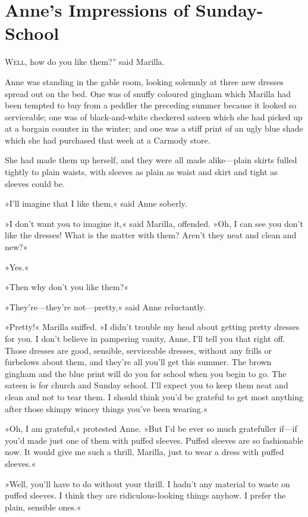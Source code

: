 \chapter{Anne’s Impressions of Sunday-School}

\lettrine[ante=“,lines=4]{W}{ell}, how do you like them?” said Marilla.

\zz
Anne was standing in the gable room, looking solemnly at three new dresses spread out on the bed. One was of snuffy coloured gingham which Marilla had been tempted to buy from a peddler the preceding summer because it looked so serviceable; one was of black-and-white checkered sateen which she had picked up at a bargain counter in the winter; and one was a stiff print of an ugly blue shade which she had purchased that week at a Carmody store.

She had made them up herself, and they were all made alike—plain skirts fulled tightly to plain waists, with sleeves as plain as waist and skirt and tight as sleeves could be.

»I’ll imagine that I like them,« said Anne soberly.

»I don’t want you to imagine it,« said Marilla, offended. »Oh, I can see you don’t like the dresses! What is the matter with them? Aren’t they neat and clean and new?«

»Yes.«

»Then why don’t you like them?«

»They’re—they’re not—pretty,« said Anne reluctantly.

»Pretty!« Marilla sniffed. »I didn’t trouble my head about getting pretty dresses for you. I don’t believe in pampering vanity, Anne, I’ll tell you that right off. Those dresses are good, sensible, serviceable dresses, without any frills or furbelows about them, and they’re all you’ll get this summer. The brown gingham and the blue print will do you for school when you begin to go. The sateen is for church and Sunday school. I’ll expect you to keep them neat and clean and not to tear them. I should think you’d be grateful to get most anything after those skimpy wincey things you’ve been wearing.«

»Oh, I am grateful,« protested Anne. »But I’d be ever so much gratefuller if—if you’d made just one of them with puffed sleeves. Puffed sleeves are so fashionable now. It would give me such a thrill, Marilla, just to wear a dress with puffed sleeves.«

»Well, you’ll have to do without your thrill. I hadn’t any material to waste on puffed sleeves. I think they are ridiculous-looking things anyhow. I prefer the plain, sensible ones.«

